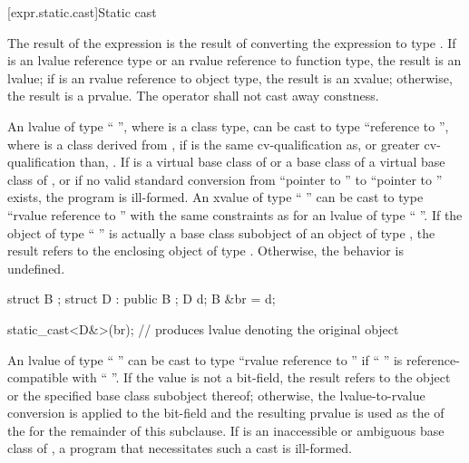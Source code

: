 [expr.static.cast]{Static cast}

\pnum
{}%
%
The result of the expression  is the result of
converting the expression  to type .
%
%
If  is an lvalue reference type
or an rvalue reference to function type, the result is an lvalue;
if  is an rvalue reference to object type, the result is an xvalue;
otherwise, the result is a prvalue. The  operator shall not cast
away constness.

\pnum
{}%
%
An lvalue of type `` '', where  is a class
type, can be cast to type ``reference to  '', where
 is a class derived from ,
if  is the
same cv-qualification as, or greater cv-qualification than,
. If  is a virtual base class of 
or a base class of a virtual base class of ,
or if no valid standard conversion from ``pointer to ''
to ``pointer to '' exists, the program is ill-formed.
An xvalue of type
`` '' can be cast to type ``rvalue reference to
 '' with the same constraints as for an lvalue of
type `` ''. If the object
of type `` '' is actually a base class subobject of an object
of type , the result refers to the enclosing object of type
. Otherwise, the behavior is undefined.
\begin{example}
\begin{codeblock}
struct B { };
struct D : public B { };
D d;
B &br = d;

static_cast<D&>(br);            // produces lvalue denoting the original  object
\end{codeblock}
\end{example}

\pnum
An lvalue
of type `` '' can be cast to type ``rvalue
reference to  '' if `` '' is
reference-compatible with ``
''. If the value is not a bit-field,
the result refers to the object or the specified base class subobject
thereof; otherwise, the lvalue-to-rvalue conversion
is applied to the bit-field and the resulting prvalue is used as the
 of the  for the remainder of this subclause.
If  is an inaccessible or
ambiguous base class of ,
a program that necessitates such a cast is ill-formed.

